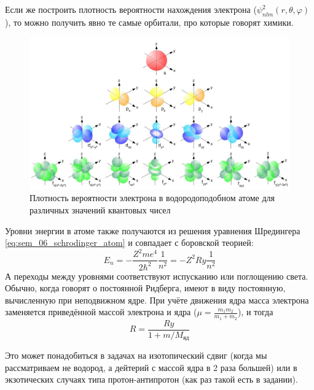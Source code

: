 \documentclass[12pt]{article}
\begin{document}
\noindent
Если же построить плотность вероятности нахождения электрона ($\psi^2_{nlm}(r, \theta, \varphi)$), то можно получить явно те самые орбитали, про которые говорят химики.
\begin{figure}[h]
    \centering
    \includegraphics[width=\textwidth,height=\textheight,keepaspectratio]{Seminar_06/pics/Pic_03.jpg}
    \caption{Плотность вероятности электрона в водородоподобном атоме для различных значений квантовых чисел}
    \label{fig:sem_04_H_energy_levels}
\end{figure}
Уровни энергии в атоме также получаются из решения уравнения Шредингера \ref{eq:sem_06_schrodinger_atom} и совпадает с боровской теорией:
\begin{equation}
   E_n = -\dfrac{Z^2me^4}{2\hbar^2} \dfrac{1}{n^2} = -Z^2 Ry\dfrac{1}{n^2}
\end{equation}
А переходы между уровнями соответствуют испусканию или поглощению света. Обычно, когда говорят о постоянной Ридберга, имеют в виду постоянную, вычисленную при неподвижном ядре. При учёте движения ядра масса электрона заменяется приведённой массой электрона и ядра ($\mu = \frac{m_1 m_2}{m_1+m_2}$), и тогда
\begin{equation*}
    R=\dfrac{Ry}{1+m/M_{\text{яд}}}
\end{equation*}

\noindent
Это может понадобиться в задачах на изотопический сдвиг (когда мы рассматриваем не водород, а дейтерий с массой ядра в 2 раза большей) или в экзотических случаях типа протон-антипротон (как раз такой есть в задании).
\end{document}
